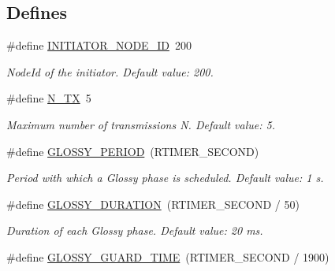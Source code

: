 \subsection*{Defines}
\begin{DoxyCompactItemize}
\item 
\hypertarget{group__glossy-test-settings_ga2e373237aef3ee2b0fdb15cd0b8c5390}{
\#define \hyperlink{group__glossy-test-settings_ga2e373237aef3ee2b0fdb15cd0b8c5390}{INITIATOR\_\-NODE\_\-ID}~200}
\label{group__glossy-test-settings_ga2e373237aef3ee2b0fdb15cd0b8c5390}

\begin{DoxyCompactList}\small\item\em NodeId of the initiator. Default value: 200. \end{DoxyCompactList}\item 
\hypertarget{group__glossy-test-settings_ga50f8fba62aef680d9929caefea7ca7e4}{
\#define \hyperlink{group__glossy-test-settings_ga50f8fba62aef680d9929caefea7ca7e4}{N\_\-TX}~5}
\label{group__glossy-test-settings_ga50f8fba62aef680d9929caefea7ca7e4}

\begin{DoxyCompactList}\small\item\em Maximum number of transmissions N. Default value: 5. \end{DoxyCompactList}\item 
\hypertarget{group__glossy-test-settings_ga6f68058577fdbfccbd8e50537609a5e4}{
\#define \hyperlink{group__glossy-test-settings_ga6f68058577fdbfccbd8e50537609a5e4}{GLOSSY\_\-PERIOD}~(RTIMER\_\-SECOND)}
\label{group__glossy-test-settings_ga6f68058577fdbfccbd8e50537609a5e4}

\begin{DoxyCompactList}\small\item\em Period with which a Glossy phase is scheduled. Default value: 1 s. \end{DoxyCompactList}\item 
\hypertarget{group__glossy-test-settings_ga26e366aad612a866fe38ef7bd7629858}{
\#define \hyperlink{group__glossy-test-settings_ga26e366aad612a866fe38ef7bd7629858}{GLOSSY\_\-DURATION}~(RTIMER\_\-SECOND / 50)}
\label{group__glossy-test-settings_ga26e366aad612a866fe38ef7bd7629858}

\begin{DoxyCompactList}\small\item\em Duration of each Glossy phase. Default value: 20 ms. \end{DoxyCompactList}\item 
\hypertarget{group__glossy-test-settings_gaf0ee14116d6799a20e4e415a5990e77c}{
\#define \hyperlink{group__glossy-test-settings_gaf0ee14116d6799a20e4e415a5990e77c}{GLOSSY\_\-GUARD\_\-TIME}~(RTIMER\_\-SECOND / 1900)}
\label{group__glossy-test-settings_gaf0ee14116d6799a20e4e415a5990e77c}


\end{DoxyCompactItemize}
